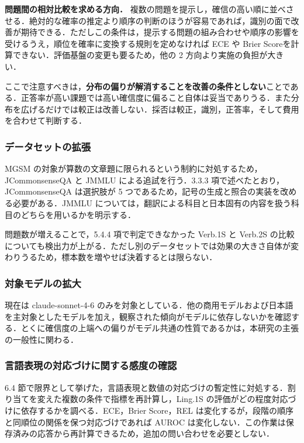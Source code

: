 \textbf{問題間の相対比較を求める方向．} 複数の問題を提示し，確信の高い順に並べさせる．絶対的な確率の推定より順序の判断のほうが容易であれば，識別の面で改善が期待できる．ただしこの条件は，提示する問題の組み合わせや順序の影響を受けるうえ，順位を確率に変換する規則を定めなければ ECE や Brier Scoreを計算できない．評価基盤の変更も要るため，他の 2 方向より実施の負担が大きい．

ここで注意すべきは，\textbf{分布の偏りが解消することを改善の条件としない}ことである．正答率が高い課題では高い確信度に偏ること自体は妥当でありうる．また分布を広げるだけでは較正は改善しない．採否は較正，識別，正答率，そして費用を合わせて判断する．

\subsubsection{データセットの拡張}

MGSM の対象が算数の文章題に限られるという制約に対処するため，JCommonsenseQA と JMMLU による追試を行う．3.3.3 項で述べたとおり，JCommonsenseQA は選択肢が 5 つであるため，記号の生成と照合の実装を改める必要がある．JMMLU については，翻訳による科目と日本固有の内容を扱う科目のどちらを用いるかを明示する．

問題数が増えることで，5.4.4 項で判定できなかった Verb.1S と Verb.2S の比較についても検出力が上がる．ただし別のデータセットでは効果の大きさ自体が変わりうるため，標本数を増やせば決着するとは限らない．

\subsubsection{対象モデルの拡大}

現在は claude-sonnet-4-6 のみを対象としている．他の商用モデルおよび日本語を主対象としたモデルを加え，観察された傾向がモデルに依存しないかを確認する．とくに確信度の上端への偏りがモデル共通の性質であるかは，本研究の主張の一般性に関わる．

\subsubsection{言語表現の対応づけに関する感度の確認}

6.4 節で限界として挙げた，言語表現と数値の対応づけの暫定性に対処する．割り当てを変えた複数の条件で指標を再計算し，Ling.1S の評価がどの程度対応づけに依存するかを調べる．ECE，Brier Score，REL は変化するが，段階の順序と同順位の関係を保つ対応づけであれば AUROC は変化しない．この作業は保存済みの応答から再計算できるため，追加の問い合わせを必要としない．

